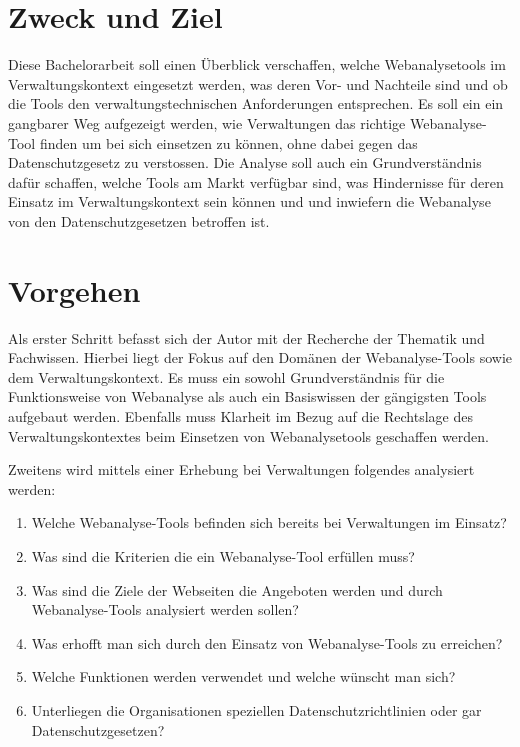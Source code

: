 \section{Zweck und Ziel}

Diese Bachelorarbeit soll einen Überblick verschaffen, welche Webanalysetools im Verwaltungskontext eingesetzt werden, was deren Vor- und Nachteile sind und ob die Tools den verwaltungstechnischen Anforderungen entsprechen. Es soll ein ein gangbarer Weg aufgezeigt werden, wie Verwaltungen das richtige Webanalyse-Tool finden um bei sich einsetzen zu können, ohne dabei gegen das Datenschutzgesetz zu verstossen. Die Analyse soll auch ein Grundverständnis dafür schaffen, welche Tools am Markt verfügbar sind, was Hindernisse für deren Einsatz im Verwaltungskontext sein können und und inwiefern die Webanalyse von den Datenschutzgesetzen betroffen ist. 


\section{Vorgehen}

Als erster Schritt befasst sich der Autor mit der Recherche der Thematik und Fachwissen. Hierbei liegt der Fokus auf den Domänen der Webanalyse-Tools sowie dem Verwaltungskontext. Es muss ein sowohl Grundverständnis für die Funktionsweise von Webanalyse als auch ein Basiswissen der gängigsten Tools aufgebaut werden. Ebenfalls muss Klarheit im Bezug auf die Rechtslage des Verwaltungskontextes beim Einsetzen von Webanalysetools geschaffen werden.

Zweitens wird mittels einer Erhebung bei Verwaltungen folgendes analysiert werden:

\begin{enumerate}
    \item Welche Webanalyse-Tools befinden sich bereits bei Verwaltungen im Einsatz?
    \item Was sind die Kriterien die ein Webanalyse-Tool erfüllen muss?
    \item Was sind die Ziele der Webseiten die Angeboten werden und durch Webanalyse-Tools analysiert werden sollen?
    \item Was erhofft man sich durch den Einsatz von Webanalyse-Tools zu erreichen?
    \item Welche Funktionen werden verwendet und welche wünscht man sich?
    \item Unterliegen die Organisationen speziellen Datenschutzrichtlinien oder gar Datenschutzgesetzen?
\end{enumerate}

